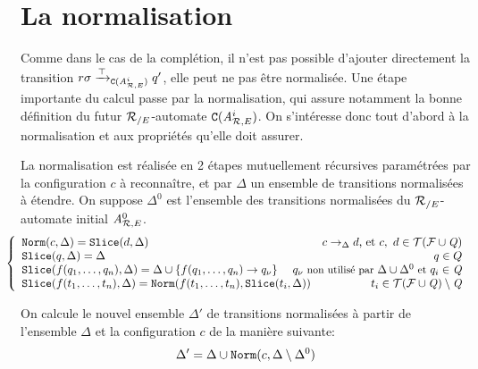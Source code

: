 \section{La normalisation}
Comme dans le cas de la complétion, il n'est pas possible d'ajouter directement
la transition $r\sigma \xrightarrow{\top}_{\mathtt{C}({\mathit A}_{\mathcal R,E}^{i})} q'$, elle peut ne pas être normalisée.
Une étape importante du calcul passe par la normalisation, qui assure notamment la bonne définition
du futur ${\mathcal R_{/E}}$-automate $\mathtt{C}({\mathit A}_{\mathcal R,E}^{i})$. 
On s'intéresse donc tout d'abord à la normalisation et aux propriétés qu'elle doit assurer.

\begin{definition}[Normalisation]
  \label{def:normalisation}
  La normalisation est réalisée en 2 étapes mutuellement récursives
  paramétrées par la configuration $c$ à reconnaître, et par $\Delta$ un ensemble de
  transitions normalisées à étendre. On suppose $\Delta^0$ est l'ensemble des transitions normalisées 
  du ${\mathcal R_{/E}}$-automate initial ${\mathit A}_{\mathcal R,E}^0$.
  \[\hspace{-.5cm}
  \left\{
    \begin{array}{lr}
      \norm(c, \Delta) = \slice(d, \Delta) & c \rw_\Delta d\textrm{, et }c,\ d \in \TFQ\\
      \slice(q,\Delta) = \Delta & q \in Q\\
      \slice(f(q_1,\dots, q_n), \Delta) = \Delta \cup \{f(q_1,\dots, q_n) \rw q_\nu\} &\hspace{-1.3cm}
      {\small q_\nu \textrm{ non utilisé par } \Delta \cup \Delta^0 \textrm{ et } q_i \in \Q}\\
      \slice(f(t_1,\dots, t_n), \Delta) = \norm(f(t_1,\dots, t_n), \slice(t_i, \Delta)) & t_i \in \TFQ \setminus \Q\\
    \end{array}
  \right.
  \]

  On calcule le nouvel ensemble $\Delta'$ de transitions normalisées à partir de l'ensemble $\Delta$ 
  et la configuration $c$ de la manière suivante:
  \[ \Delta' = \Delta \cup \mathtt{Norm}(c, \Delta \setminus \Delta^0)  \]

\end{definition}

